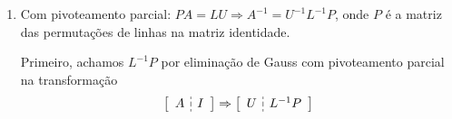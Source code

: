 \documentclass[a4paper,12pt,fleqn]{article}
\begin{document}
\begin{enumerate}
{\begin{enumerate}
	Depois, achamos achamos $U^{-1}$ por Gauss-Jordan na transformação
     \begin{equation*}
   		  \setlength{\dashlinegap}{2pt}
  		  \left[
  		  		\begin{array}{c:c}
				   U & I 
		        \end{array}
		  \right]
		  \Rightarrow
   		  \setlength{\dashlinegap}{2pt}
  		  \left[
  		  		\begin{array}{c:c}
				   I & U ^{-1} 
		        \end{array}
		  \right]
	\end{equation*}

    de onde tiramos 
	\[ U^{-1} =
    \left[ {\begin{array}{rrr}
		1/2 & 1/6 & -2/15 \\
		{\color{red} 0 } & 1/6 & 1/6 \\
		{\color{red} 0 } & {\color{red} 0} & 1/5 
  \end{array} } \right]; 
   \]
   
   Assim,
   \[ A^{-1} =
    \left[ {\begin{array}{rrr}
		1/2 & 1/6 & -2/15 \\
		{\color{red} 0 } & 1/6 & 1/6 \\
		{\color{red} 0 } & {\color{red} 0} & 1/5 
  \end{array} } \right]
    \left[ {\begin{array}{rrr}
		1 & 0 & 0 \\
		{\color{red} -2 } & 1 & 0 \\
		{\color{red} 1/2 } & {\color{red} 3/2} & 1 
  \end{array} } \right].
   \]
   
   
   
   \item Com pivoteamento parcial: $PA = LU \Rightarrow A^{-1} = U^{-1} L^{-1} P$, onde $P$ é a matriz das permutações de linhas na matriz identidade.
   
   Primeiro, achamos $L^{-1}P$ por eliminação de Gauss com pivoteamento parcial na transformação
    \begin{equation*}
   		  \setlength{\dashlinegap}{2pt}
  		  \left[
  		  		\begin{array}{c:c}
				   A & I 
		        \end{array}
		  \right]
		  \Rightarrow
   		  \setlength{\dashlinegap}{2pt}
  		  \left[
  		  		\begin{array}{c:c}
				   U & L ^{-1} P 
		        \end{array}
		  \right]
	\end{equation*}  
	

\end{enumerate}}
\end{enumerate}
\end{document}
